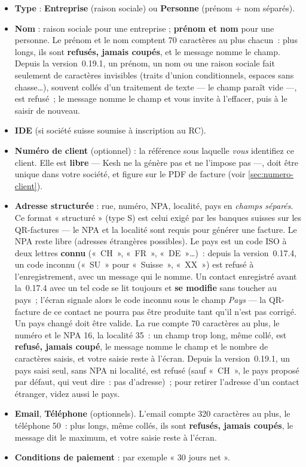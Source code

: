 \documentclass[a4paper,11pt,oneside]{article}
\begin{document}
\begin{itemize}
    \item \textbf{Type} : \textbf{Entreprise} (raison sociale) ou \textbf{Personne} (prénom + nom séparés).
    \item \textbf{Nom} : raison sociale pour une entreprise ; \textbf{prénom et nom} pour une personne. Le prénom et le nom comptent 70 caractères au plus chacun~: plus longs, ils sont \textbf{refusés, jamais coupés}, et le message nomme le champ. Depuis la version~0.19.1, un prénom, un nom ou une raison sociale fait seulement de caractères invisibles (traits d'union conditionnels, espaces sans chasse…), souvent collés d'un traitement de texte --- le champ paraît vide ---, est refusé~; le message nomme le champ et vous invite à l'effacer, puis à le saisir de nouveau.
    \item \textbf{IDE} (si société suisse soumise à inscription au RC).
    \item \textbf{Numéro de client} (optionnel) : la référence sous laquelle \emph{vous} identifiez ce client. Elle est \textbf{libre} --- Kesh ne la génère pas et ne l'impose pas ---, doit être unique dans votre société, et figure sur le PDF de facture (voir \ref{sec:numero-client}).
    \item \textbf{Adresse structurée} : rue, numéro, NPA, localité, pays en \emph{champs séparés}. Ce format « structuré » (type S) est celui exigé par les banques suisses sur les QR-factures — le NPA et la localité sont requis pour générer une facture. Le NPA reste libre (adresses étrangères possibles). Le pays est un code ISO à deux lettres \textbf{connu} («~CH~», «~FR~», «~DE~»…)~: depuis la version~0.17.4, un code inconnu («~SU~» pour «~Suisse~», «~XX~») est refusé à l'enregistrement, avec un message qui le nomme. Un contact enregistré avant la~0.17.4 avec un tel code se lit toujours et \textbf{se modifie} sans toucher au pays~; l'écran signale alors le code inconnu sous le champ \emph{Pays} --- la QR-facture de ce contact ne pourra pas être produite tant qu'il n'est pas corrigé. Un pays changé doit être valide. La rue compte 70 caractères au plus, le numéro et le NPA 16, la localité 35~: un champ trop long, même collé, est \textbf{refusé, jamais coupé}, le message nomme le champ et le nombre de caractères saisis, et votre saisie reste à l'écran. Depuis la version~0.19.1, un pays saisi seul, sans NPA ni localité, est refusé (sauf «~CH~», le pays proposé par défaut, qui veut dire~: pas d'adresse)~; pour retirer l'adresse d'un contact étranger, videz aussi le pays.
    \item \textbf{Email}, \textbf{Téléphone} (optionnels). L'email compte 320 caractères au plus, le téléphone 50~: plus longs, même collés, ils sont \textbf{refusés, jamais coupés}, le message dit le maximum, et votre saisie reste à l'écran.
    \item \textbf{Conditions de paiement} : par exemple « 30 jours net ».
\end{itemize}
\end{document}
